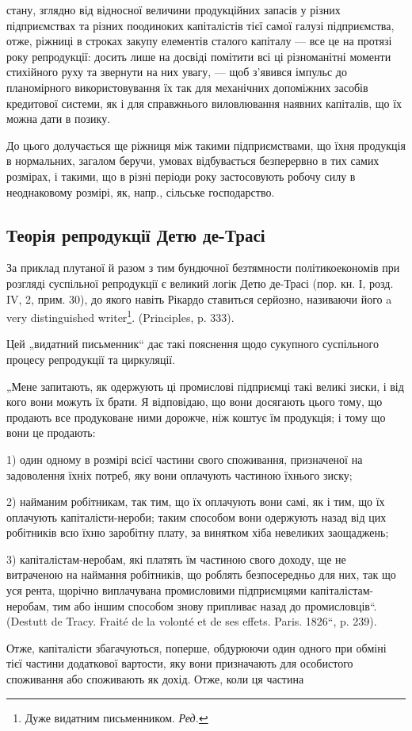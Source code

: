\parcont{}  %
стану, зглядно від відносної величини продукційних запасів у різних
підприємствах та різних поодиноких капіталістів тієї самої галузі підприємства,
отже, ріжниці в строках закупу елементів сталого капіталу —
все це на протязі року репродукції: досить лише на досвіді помітити
всі ці різноманітні моменти стихійного руху та звернути на них увагу, —
щоб з’явився імпульс до планомірного використовування їх так для механічних
допоміжних засобів кредитової системи, як і для справжнього
виловлювання наявних капіталів, що їх можна дати в позику.

До цього долучається ще ріжниця між такими підприємствами, що
їхня продукція в нормальних, загалом беручи, умовах відбувається
безперервно в тих самих розмірах, і такими, що в різні періоди року
застосовують робочу силу в неоднаковому розмірі, як, напр., сільське
господарство.
\label{original-373-1}

\subsection[Теорія репродукції Детю де-Трасі]{Теорія репродукції Детю де-Трасі\footnotemark{}}


\label{original-373-2}
\noindent{}За приклад плутаної й разом з тим бундючної безтямности політикоекономів
при розгляді суспільної репродукції є великий логік Детю
де-Трасі (пор. кн. І, розд. IV, 2, прим. 30), до якого навіть Рікардо
ставиться серйозно, називаючи його a very distinguished writer\footnote*{
Дуже видатним письменником. \emph{Ред.}
}. (Principles,
p. 333).

Цей „видатний письменник“ дає такі пояснення щодо сукупного суспільного
процесу репродукції та циркуляції.

„Мене запитають, як одержують ці промислові підприємці такі великі
зиски, і від кого вони можуть їх брати. Я відповідаю, що вони досягають
цього тому, що продають все продуковане ними дорожче, ніж коштує
їм продукція; і тому що вони це продають:

1) один одному в розмірі всієї частини свого споживання, призначеної
на задоволення їхніх потреб, яку вони оплачують частиною їхнього
зиску;

2) найманим робітникам, так тим, що їх оплачують вони самі, як і тим, що їх
оплачують капіталісти-нероби; таким способом вони одержують назад від цих
робітників всю їхню заробітну плату, за винятком хіба невеликих заощаджень;

3) капіталістам-неробам, які платять їм частиною свого доходу, ще
не витраченою на наймання робітників, що роблять безпосередньо для
них, так що уся рента, щорічно виплачувана промисловими підприємцями
капіталістам-неробам, тим або іншим способом знову припливає
назад до промисловців“. (Destutt de Tracy. Fraité de la volonté et de ses
effets. Paris. 1826“, p. 239).

Отже, капіталісти збагачуються, поперше, обдурюючи один одного при
обміні тієї частини додаткової вартости, яку вони призначають для особистого
споживання або споживають як дохід. Отже, коли ця частина
\parbreak{}  %
